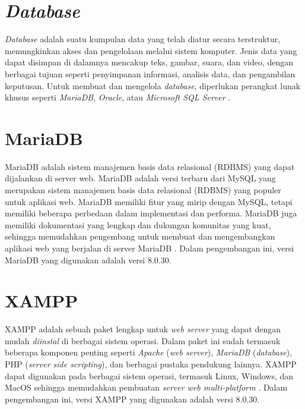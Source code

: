 \section{\textit{Database}}
\textit{Database} adalah suatu kumpulan data yang telah diatur secara terstruktur, memungkinkan akses dan pengelolaan melalui sistem komputer. Jenis data yang dapat disimpan di dalamnya mencakup teks, gambar, suara, dan video, dengan berbagai tujuan seperti penyimpanan informasi, analisis data, dan pengambilan keputusan. Untuk membuat dan mengelola \textit{database}, diperlukan perangkat lunak khusus seperti \textit{MariaDB}, \textit{Oracle}, atau \textit{Microsoft SQL Server} \cite{Cowls2021ADB}.

\section{MariaDB}
MariaDB adalah sistem manajemen basis data relasional (RDBMS) yang dapat dijalankan di server web. MariaDB adalah versi terbaru dari MySQL yang merupakan sistem manajemen basis data relasional (RDBMS) yang populer untuk aplikasi web. MariaDB memiliki fitur yang mirip dengan MySQL, tetapi memiliki beberapa perbedaan dalam implementasi dan performa. MariaDB juga memiliki dokumentasi yang lengkap dan dukungan komunitas yang kuat, sehingga memudahkan pengembang untuk membuat dan mengembangkan aplikasi web yang berjalan di server MariaDB \cite{mariadb2024}. Dalam pengembangan ini, versi MariaDB yang digunakan adalah versi 8.0.30.

\section{XAMPP}
XAMPP adalah sebuah paket lengkap untuk \textit{web server} yang dapat dengan mudah \textit{diinstal} di berbagai sistem operasi. Dalam paket ini sudah termasuk beberapa komponen penting seperti \textit{Apache} (\textit{web server}), \textit{MariaDB} (\textit{database}), PHP (\textit{server side scripting}), dan berbagai pustaka pendukung lainnya. XAMPP dapat digunakan pada berbagai sistem operasi, termasuk Linux, Windows, dan MacOS sehingga memudahkan pembuatan \textit{server web multi-platform} \cite{pakpahan2020sistem}. Dalam pengembangan ini, versi XAMPP yang digunakan adalah versi 8.0.30.